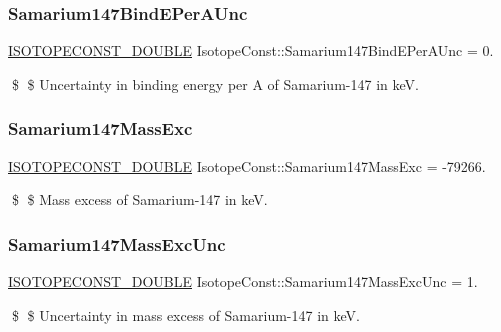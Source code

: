 \subsubsection{\texorpdfstring{Samarium147\+Bind\+E\+Per\+A\+Unc}{Samarium147BindEPerAUnc}}
{\footnotesize\ttfamily \mbox{\hyperlink{group___isotope_const-_macros_ga8f45a7272ce02c0b4c65c44636ed719a}{I\+S\+O\+T\+O\+P\+E\+C\+O\+N\+S\+T\+\_\+\+D\+O\+U\+B\+LE}} Isotope\+Const\+::\+Samarium147\+Bind\+E\+Per\+A\+Unc = 0.}

\$ \$ Uncertainty in binding energy per A of Samarium-\/147 in keV. \mbox{\label{group___isotope_const-_samarium-_sm147_ga0ec5a5707546124b97a530a0b1444a21}} 
\subsubsection{\texorpdfstring{Samarium147\+Mass\+Exc}{Samarium147MassExc}}
{\footnotesize\ttfamily \mbox{\hyperlink{group___isotope_const-_macros_ga8f45a7272ce02c0b4c65c44636ed719a}{I\+S\+O\+T\+O\+P\+E\+C\+O\+N\+S\+T\+\_\+\+D\+O\+U\+B\+LE}} Isotope\+Const\+::\+Samarium147\+Mass\+Exc = -\/79266.}

\$ \$ Mass excess of Samarium-\/147 in keV. \mbox{\label{group___isotope_const-_samarium-_sm147_ga158ce846770d397d95660585c18f8400}} 
\subsubsection{\texorpdfstring{Samarium147\+Mass\+Exc\+Unc}{Samarium147MassExcUnc}}
{\footnotesize\ttfamily \mbox{\hyperlink{group___isotope_const-_macros_ga8f45a7272ce02c0b4c65c44636ed719a}{I\+S\+O\+T\+O\+P\+E\+C\+O\+N\+S\+T\+\_\+\+D\+O\+U\+B\+LE}} Isotope\+Const\+::\+Samarium147\+Mass\+Exc\+Unc = 1.}

\$ \$ Uncertainty in mass excess of Samarium-\/147 in keV. \mbox{\label{group___isotope_const-_samarium-_sm147_ga61a615c820760d5cecfe4249cd3c864c}} 
